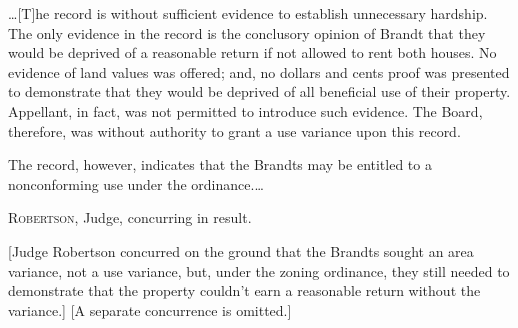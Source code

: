 \ldots [T]he record is without sufficient evidence to establish unnecessary
hardship. The only evidence in the record is the conclusory opinion of Brandt
that they would be deprived of a reasonable return if not allowed to rent both
houses. No evidence of land values was offered; and, no dollars and cents proof
was presented to demonstrate that they would be deprived of all beneficial use
of their property. Appellant, in fact, was not permitted to introduce such
evidence. The Board, therefore, was without authority to grant a use variance
upon this record. 

The record, however, indicates that the Brandts may be entitled to a
nonconforming use under the ordinance.\ldots 

\opinion \textsc{Robertson}, Judge, concurring in result.

[Judge Robertson
concurred on the ground that the Brandts sought an area variance, not a use
variance, but, under the zoning ordinance, they still needed to demonstrate that
the property couldn't earn a reasonable return without the variance.] [A
separate concurrence is omitted.]

